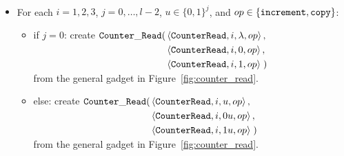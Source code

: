 \subsubsection{\cread}

\begin{itemize}
\item For each $i = 1,2,3$,
               $j = 0,\ldots,l-2$,
               $u \in \{0, 1\}^j$, and
               $op \in \{{\tt increment}, {\tt copy} \}$:
    \begin{itemize}
        \item if $j = 0$:
        create
        $\begin{aligned}[t]
            {\tt Counter\_Read}(& \left\langle {\tt CounterRead}, i, \lambda, op \right\rangle, \\
                   & \left\langle {\tt CounterRead}, i, 0,      op \right\rangle, \\
                   & \left\langle {\tt CounterRead}, i, 1,      op \right\rangle \;)
        \end{aligned}$\\ from the general gadget in Figure~\ref{fig:counter_read}.

        \item else:
        create $\begin{aligned}[t]
        {\tt Counter\_Read}(& \left\langle {\tt CounterRead}, i, u,  op \right\rangle, \\
               & \left\langle {\tt CounterRead}, i, 0u, op \right\rangle, \\
               & \left\langle {\tt CounterRead}, i, 1u, op \right\rangle \;)
        \end{aligned}$\\ from the general gadget in Figure~\ref{fig:counter_read}.
    \end{itemize}

\end{itemize}

